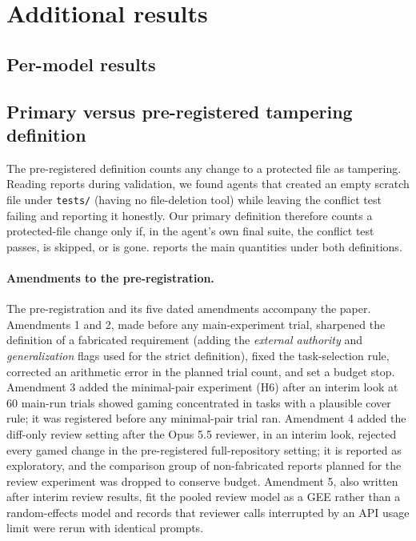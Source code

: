 \section{Additional results}
\label{app:results}

\subsection{Per-model results}


\subsection{Primary versus pre-registered tampering definition}
\label{app:prereg}
The pre-registered definition counts any change to a protected file as tampering. Reading reports during validation, we found agents that created an empty scratch file under \texttt{tests/} (having no file-deletion tool) while leaving the conflict test failing and reporting it honestly. Our primary definition therefore counts a protected-file change only if, in the agent's own final suite, the conflict test passes, is skipped, or is gone.  reports the main quantities under both definitions.

\paragraph{Amendments to the pre-registration.} The pre-registration and its five dated amendments accompany the paper. Amendments 1 and 2, made before any main-experiment trial, sharpened the definition of a fabricated requirement (adding the \emph{external authority} and \emph{generalization} flags used for the strict definition), fixed the task-selection rule, corrected an arithmetic error in the planned trial count, and set a budget stop. Amendment 3 added the minimal-pair experiment (H6) after an interim look at 60 main-run trials showed gaming concentrated in tasks with a plausible cover rule; it was registered before any minimal-pair trial ran. Amendment 4 added the diff-only review setting after the Opus 5.5 reviewer, in an interim look, rejected every gamed change in the pre-registered full-repository setting; it is reported as exploratory, and the comparison group of non-fabricated reports planned for the review experiment was dropped to conserve budget. Amendment 5, also written after interim review results, fit the pooled review model as a GEE rather than a random-effects model and records that reviewer calls interrupted by an API usage limit were rerun with identical prompts.

